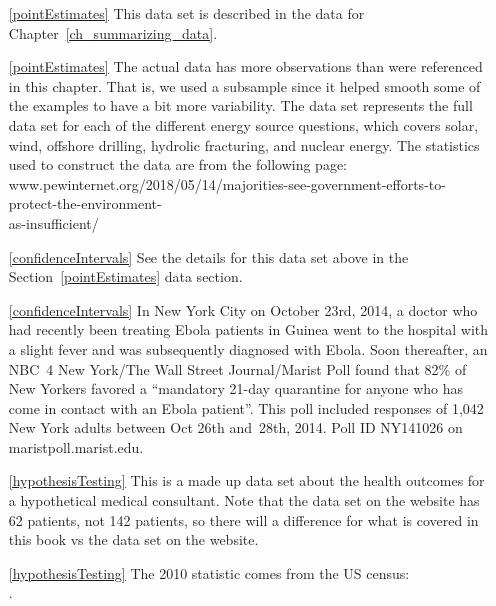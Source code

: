 \begin{itemize}

\item[\ref{pointEstimates}]
    This data set is described in
    the data for Chapter~\ref{ch_summarizing_data}.

\item[\ref{pointEstimates}]
    The actual data has more observations than were referenced
    in this chapter.
    That is, we used a subsample since it helped smooth some
    of the examples to have a bit more variability.
    The  data set represents
    the full data set for each of the different energy source
    questions, which covers solar, wind, offshore drilling,
    hydrolic fracturing, and nuclear energy.
    The statistics used to construct the data are from
    the following page: \\
        {{\small{www.pewinternet.org/2018/05/14/majorities-see-government-efforts-to-protect-the-environment-\\as-insufficient/}}}
    
\item[\ref{confidenceIntervals}]
    See the details for this data set above
    in the Section~\ref{pointEstimates} data section.
\item[\ref{confidenceIntervals}]
    In New York City on October 23rd, 2014, a doctor who had
    recently been treating Ebola patients in Guinea went to
    the hospital with a slight fever and was subsequently
    diagnosed with Ebola.
    Soon thereafter, an NBC~4 New York/The Wall Street
    Journal/Marist Poll found that
    82\% of New Yorkers favored a
    ``mandatory 21-day quarantine for anyone who has come
    in contact with an Ebola patient''.
    This poll included responses of 1,042
    New York adults between Oct 26th and~28th, 2014.
        {Poll ID NY141026 on maristpoll.marist.edu}.

\item[\ref{hypothesisTesting}]
    This is a made up data set about the health outcomes
    for a hypothetical medical consultant.
    Note that the data set on the website has 62 patients,
    not 142 patients, so there will a difference for what
    is covered in this book vs the data set on the website.

\item[\ref{hypothesisTesting}]
    The 2010 statistic comes from the US census:\\
    .

\end{itemize}


